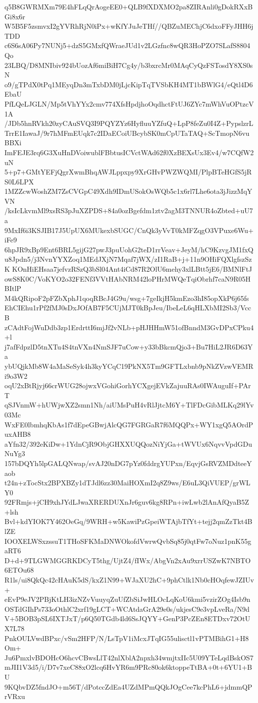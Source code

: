 q5B8GWRMXm79E4hFLqQrAogeEE0+QLB9fXDXMO2pa8ZIRAnli0gDokRXxBGi8x6r
W5B5F5zsmvxI2gYVRhRjN0iPx+wKfYJuJeTHf//QBZuMEChjC6dxoFFyJHH6jTDD
c6S6sA06Py7NUNj5+dzS5GMxfQWraeJUd1v2LGzfnc8wQR3HoPZO7SLafS8804Qo
23LBQ/D8MNIbiv924bUozAf6miBiH7Cg4y/b3bxrcMr0MAqCyQzFSTosdY8XS0sN
o9/gTPdX0tPq1MEyqDn3mTxbDM0jLjcKipTqTVSbKH4MT1bBWlG4/eQtl4D6EbaU
PfLQeLJGLN/Mp5tVhYYx2cmv774XfsHpdjhoOqdhctFtUJ6ZYc7mWhVuOPtzcV1A
/JDb5hnRVkh20zyCAuSVQ3I9PQYZYz6HyfluuYZfuQ+LpP8feZu0I4Z+PypslzrL
TrrE1IawaJ/9r7hMFmEUqk7c2IDaECoiUBcybSK0mCpUTaTAQ+ScTmopN6vuBBXi
ImFEJE3rq6G3XuHnDVoiwublFBbtusICVctWAd62f0XzBEXsUx3Ev4/w7CQfW2uN
5+p7+GMtYEFjQgrXwmBhqAWJLppxpy9XrGHvPWZWQMI/PlpBTeHGfS5jRS0L6LPX
1MZZcwWoshZM7ZsCVGpC49Xdh9IDmUSokOsWQb5c1x6rl7Lhe6ota3jJizzMqYVN
/ksIcLkvmMl9xsRS3pJuXZPDS+84a0ozBgefdm1ztv2agM3TNNUR4oZbted+uU7a
9MxIf6i3KSJIB17J5UpUX6MUkexbSUGC/CnQk3yVvT0kMFZqgO3VPuxe6Wu+iFe9
6hpJR9xBp9Ent6BRL5gijG27pwJ3puUohG2teD1rrVeav+JeyM/hC9KzvgJM1fxQ
u8Jpdn5/j3NvnYYXZoq1MEdJXjN7Mqaf7jWX/zI1RaB+j+11n9OHiFQXlgfszSzK
KOnHiEHsaa7jefvzRSzQ3bSl04Ant4iCd87R2OlU6mehy3xlLBtt5jE6/BMNlFtJ
owS8K0C/VoKYO2o32FENf3VVtHAbNRM42loPHrMWQeTqiObrhf7caN9R05HBItlP
M4kQRipoF2pFZbXphJ1qoqRBcJ4G9u/wsg+7geIkjH5kmEzo3hI85opXkP6j65fs
EhCIEhu1rPf2fMJ0sDxJOfAB7F5CUjMJT0kBpJeu/IbeLeL6qHLXbMI2Sb3/VccB
zCAdtFojWuDdb3zp1ErdrttI6mjJf2vNLb+pHJHHmW51ofBnndM3GvDPxCPku4+l
j7afFdpzlD5tnXTu4S4tnVXn4NmSJF7uCow+y33bBkcmQjo3+Bu7HiL2JR6D63Ya
ybUQjkMb8W4aMaSeSyk4h3kyYCqC19PkNX5Tm9GFTLxbnb9pNkZVzwVEMRi9o3W2
oqU2xBtRjyj66crWUG28ojwxVGohiGorhYCXgejEVkZajuuRAs0IWAuguIf+PArT
qSJVnmW+hUWjwXZ2smn1Nh/aiUMsPuH4vRlJjtcM6Y+TlFDcGibMLKq29lYv03Mc
WxFE0lbmhqKbAs1f7dEpeGBwjAlcQG7FGRGaR7f6MQQPx+WY1xgQ5AOrdPuxAHB8
aYfn32/392eKiDw+1YdnCjR9ObjGHXXUQQozNiYjGa+tWVUx6NqvvVpdGDuNuYg3
157bDQYh5lpGALQNwap/svAJ20nDG7pYz0fddrgYUPxn/EqvjGsRVZMDdteeYaob
t24n+zTocStx2BPXBZy1dTJdl6zz30MaiHOXmI2q8Z9ws/E6uL3QiVUEP/grWLY0
92FRmjs+jCH9xhJYdLJwaXRERDUXnJr6guv6kg8RPn+iwLwb2lAnAfQyaB5Z+lsh
Bvl+kdYIOK7Y462OeGq/9WRH+w5KawiPzGpeiWTAjbTfYt+tejj2qmZzTkt4BlZE
IOOXELWSxzssuT1THoSFKMaDNWOkofdVwrwQvbSq85j0qtFw7oNuz1pnK55gaRT6
D+d+9TLGWMGGRKDCyT5thg/UjtZ4/fIWx/AbgVn2xAu9xrrUSZwK7NBTO6ETOu68
R1ls/ui8QkQc42cHAuK5dS/kxZ1N99+WJaXU2hC+9phCtlk1Nb0cHOqfewJZIUv+
eEvP9eJV2PBjKtLH3izNZvVuuyqZuUfZbSiJwHLOcLqKoU6kmi5vzirZOg4Isb9n
OSTdGIhPs733oOthlC2xrf19gLCT+WCAtdaGrA29e0s/ukjesC9e3vpLveRa/N9d
V+5BOB3pSL6IXTJxT/p6Q50TGdb4ld6SsJQYY+GenP3PcZEn8ETDxv72OtUX7L78
PnkOULVwdBPxc/vSm2HFP/N/LsTpV1iMcxJTqIG55ulisctl1vPTMBihG1+H8Om+
Ju6PmxlvBDOHcO6hcvCBwsLlT42nlXblA2npxh34wmjtxIIc5U09YTeLqdBskOS7
mJII1V3d5/i/D7v7xeC88xO2lcq6HvYR6m9PRc80ok6ktoppeTtBA+0t+6YU1+BU
9KQbvDZ5fndJO+m56T/dPotccZdEa4UZdMPmQQkJOgCee7kcPhL6+jdmmQPrVRxu
